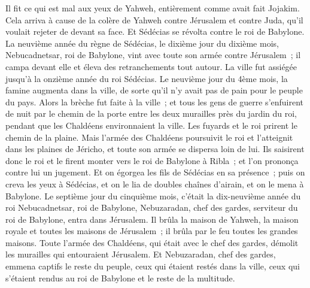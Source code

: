 \begin{multicols}{2}
Il fit ce qui est mal aux yeux de Yahweh, entièrement comme avait fait Jojakim.
Cela arriva à cause de la colère de Yahweh contre Jérusalem et contre Juda, qu'il voulait rejeter de devant sa face. Et Sédécias se révolta contre le roi de Babylone.
\VerseOne{}La neuvième année du règne de Sédécias, le dixième jour du dixième mois, Nebucadnetsar, roi de Babylone, vint avec toute son armée contre Jérusalem~; il campa devant elle et éleva des retranchements tout autour.
La ville fut assiégée jusqu'à la onzième année du roi Sédécias.
Le neuvième jour du 4ème mois, la famine augmenta dans la ville, de sorte qu'il n'y avait pas de pain pour le peuple du pays.
Alors la brèche fut faite à la ville~; et tous les gens de guerre s'enfuirent de nuit par le chemin de la porte entre les deux murailles près du jardin du roi, pendant que les Chaldéens environnaient la ville. Les fuyards et le roi prirent le chemin de la plaine.
Mais l'armée des Chaldéens poursuivit le roi et l'atteignit dans les plaines de Jéricho, et toute son armée se dispersa loin de lui.
Ils saisirent donc le roi et le firent monter vers le roi de Babylone à Ribla~; et l'on prononça contre lui un jugement.
Et on égorgea les fils de Sédécias en sa présence~; puis on creva les yeux à Sédécias, et on le lia de doubles chaînes d'airain, et on le mena à Babylone.
Le septième jour du cinquième mois, c'était la dix-neuvième année du roi Nebucadnetsar, roi de Babylone, Nebuzaradan, chef des gardes, serviteur du roi de Babylone, entra dans Jérusalem.
Il brûla la maison de Yahweh, la maison royale et toutes les maisons de Jérusalem~; il brûla par le feu toutes les grandes maisons.
Toute l'armée des Chaldéens, qui était avec le chef des gardes, démolit les murailles qui entouraient Jérusalem.
Et Nebuzaradan, chef des gardes, emmena captifs le reste du peuple, ceux qui étaient restés dans la ville, ceux qui s'étaient rendus au roi de Babylone et le reste de la multitude.

\end{multicols}
